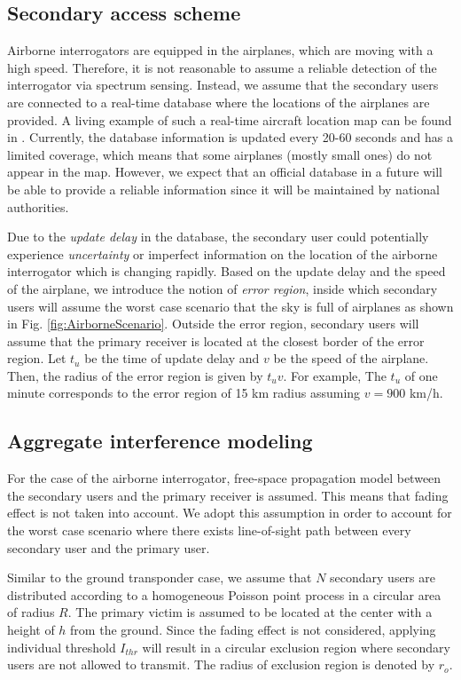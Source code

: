\documentclass[12pt,submission,journal,onecolumn]{IEEEtran}
\begin{document}
\subsection{Secondary access scheme}
\label{subsec:AirborneScheme}
Airborne interrogators are equipped in the airplanes, which are moving with a high speed. Therefore, it is not reasonable to assume a reliable detection of the interrogator via spectrum sensing. Instead, we assume that the secondary users are connected to a real-time database where the locations of the airplanes are provided. A living example of such a real-time aircraft location map can be found in \cite{misc:RDB}. Currently, the database information is updated every 20-60 seconds and has a limited coverage, which means that some airplanes (mostly small ones) do not appear in the map. However, we expect that an official database in a future will be able to provide a reliable information since it will be maintained by national authorities.

Due to the \emph{update delay} in the database, the secondary user could potentially experience \emph{uncertainty} or imperfect information on the location of the airborne interrogator which is changing rapidly. Based on the update delay and the speed of the airplane, we introduce the notion of \emph{error region}, inside which secondary users will assume the worst case scenario that the sky is full of airplanes as shown in Fig. \ref{fig:AirborneScenario}. Outside the error region, secondary users will assume that the primary receiver is located at the closest border of the error region. Let $t_{u}$ be the time of update delay and $v$ be the speed of the airplane. Then, the radius of the error region is given by $t_{u} v$. For example, The $t_{u}$ of one minute corresponds to the error region of 15 km radius assuming $v=900$ km/h.

\subsection{Aggregate interference modeling}
\label{subsec:AirborneModel}
For the case of the airborne interrogator, free-space propagation model between the secondary users and the primary receiver is assumed. This means that fading effect is not taken into account. We adopt this assumption in order to account for the worst case scenario where there exists line-of-sight path between every secondary user and the primary user.

Similar to the ground transponder case, we assume that $N$ secondary users are distributed according to a homogeneous Poisson point process in a circular area of radius $R$. The primary victim is assumed to be located at the center with a height of $h$ from the ground. Since the fading effect is not considered, applying individual threshold $I_{thr}$ will result in a circular exclusion region where secondary users are not allowed to transmit. The radius of exclusion region is denoted by $r_o$.
\end{document}
